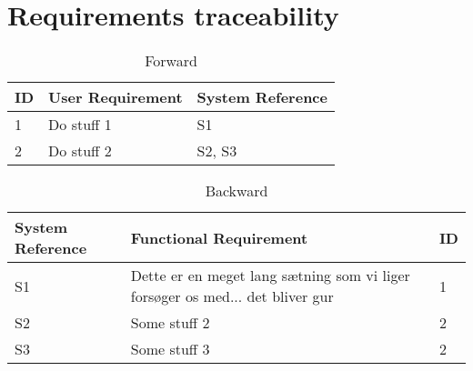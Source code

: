 \documentclass[Main]{subfiles}
\begin{document}
\chapter{Requirements traceability}

\begin{table}[htbp]
	\centering
	\begin{tabular}{l p{10cm} l} \hline
	ID & User Requirement & System Reference \\\hline
	1 & Do stuff 1 & S1 \\
	2 & Do stuff 2 & S2, S3 \\\hline
	\end{tabular}

\caption{Forward}
\label{Tab:Forward}
\end{table}


\begin{table}[htbp]
	\centering
	\begin{tabular}{p{3.5cm} p{10cm} l} \hline
	System Reference & Functional Requirement & ID\\\hline
	S1 & Dette er en meget lang sætning som vi liger forsøger os med... det bliver gur & 1 \\
	S2 & Some stuff 2 & 2 \\ 
	S3 & Some stuff 3 & 2\\\hline
	\end{tabular}

\caption{Backward}
\label{Tab:Backward}
\end{table}
\end{document}
